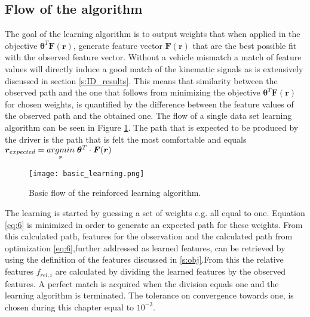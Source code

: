 \subsection{Flow of the algorithm}
The goal of the learning algorithm is to output weights that when applied in the objective $\bm{\theta}^T\bm{F}(\bm{r})$, generate feature vector  $\bm{F(\bm{r})}$ that are the best possible fit with the observed feature vector. Without a vehicle mismatch a match of feature values will directly induce a good match of the kinematic signals as is extensively discussed in section \ref{s:ID_results}. This means that similarity between the observed path and the one that follows from minimizing the objective $\bm{\theta}^T\bm{F}(\bm{r})$ for chosen weights, is quantified by the difference between the feature values of the observed path and the obtained one. The flow of a single data set learning algorithm can be seen in Figure \ref{fig:basic learning}. The path that is expected to be produced by the driver is the path that is felt the most comfortable and equals $\bm{r}_{expected} =  \underset{\bm{r}}{argmin} \hspace{1mm}  \bm{\theta}^T\cdot \bm{F}(\bm{r})$\\

\begin{figure}[h!]
	\centering
	\texttt{[image: basic\_learning.png]}
	\caption{Basic flow of the reinforced learning algorithm.}
	\label{fig:basic learning}
\end{figure}

The learning is started by guessing a set of weights e.g. all equal to one. Equation \ref{eq:6} is minimized in order to generate an expected path for these weights. From this calculated path, features for the observation and the calculated path from optimization \ref{eq:6},further addressed as learned features, can be retrieved by using the definition of the features discussed in \ref{s:obj}.From this the relative features $f_{rel,i}$ are calculated by dividing the learned features by the observed features. A perfect match is acquired when the division equals one and the learning algorithm is terminated. The tolerance on convergence towards one, is chosen during this chapter equal to $10^{-3}$.  


